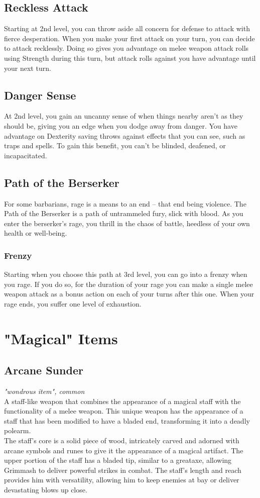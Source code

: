 \documentclass[letterpaper,openany,oneside,twocolumn]{book}
\begin{document}
\subsection*{Reckless Attack}
Starting at 2nd level, you can throw aside all concern for defense to attack with fierce desperation. When you make your first attack on your turn, you can decide to attack recklessly. Doing so gives you advantage on melee weapon attack rolls using Strength during this turn, but attack rolls against you have advantage until your next turn.
\subsection*{Danger Sense}
At 2nd level, you gain an uncanny sense of when things nearby aren't as they should be, giving you an edge when you dodge away from danger. You have advantage on Dexterity saving throws against effects that you can see, such as traps and spells. To gain this benefit, you can't be blinded, deafened, or incapacitated.
\subsection*{Path of the Berserker}
For some barbarians, rage is a means to an end – that end being violence. The Path of the Berserker is a path of untrammeled fury, slick with blood. As you enter the berserker's rage, you thrill in the chaos of battle, heedless of your own health or well-being.
\subsubsection*{Frenzy}
Starting when you choose this path at 3rd level, you can go into a frenzy when you rage. If you do so, for the duration of your rage you can make a single melee weapon attack as a bonus action on each of your turns after this one. When your rage ends, you suffer one level of exhaustion.

\section*{"Magical" Items}
\subsection*{Arcane Sunder}
\textit{"wondrous item", common}\\
A staff-like weapon that combines the appearance of a magical staff with the functionality of a melee weapon. This unique weapon has the appearance of a staff that has been modified to have a bladed end, transforming it into a deadly polearm.\\
The staff's core is a solid piece of wood, intricately carved and adorned with arcane symbols and runes to give it the appearance of a magical artifact. The upper portion of the staff has a bladed tip, similar to a greataxe, allowing Grimmash to deliver powerful strikes in combat. The staff's length and reach provides him with versatility, allowing him to keep enemies at bay or deliver devastating blows up close.
\end{document}
